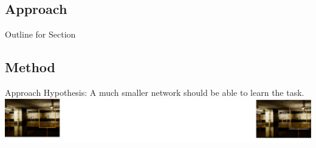 \documentclass{beamer}
\begin{document}
\begin{darkframes}
    \section{Approach}
        \begin{frame}{Outline for Section \thesection}
    \tableofcontents[currentsection]
\end{frame}
  \subsection{Method}
    \begin{frame}{Approach}
  Hypothesis: A much smaller network should be able to learn the task.
  \\ \bigskip \bigskip
	\includegraphics[width=\textwidth]{fig/approach}
    \end{frame}
    

\end{darkframes}
\end{document}
